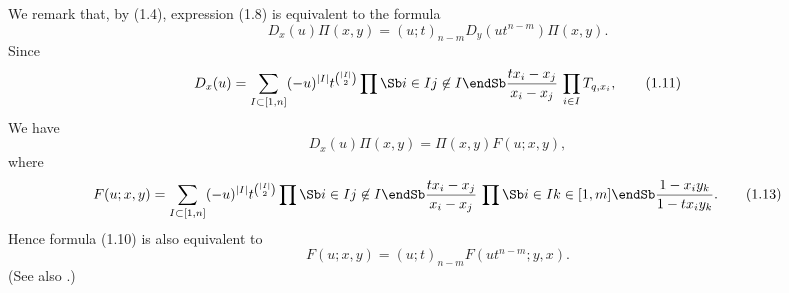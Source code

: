We remark that, by (1.4), expression (1.8) is equivalent to the formula
$$
D_x(u)\Pi(x,y)=(u;t)_{n-m} D_y(u t^{n-m}) \Pi(x,y).
\tag{1.10}
$$
Since 
$$
D_x(u)=\sum_{I\subset[1,n]} (-u)^{|I|} t^{\binom{|I|}{2}}
\prod\Sb i\in I\\ j\not\in I\endSb
\frac{tx_i-x_j}{x_i-x_j} \, \prod_{i\in I}T_{q,x_i}, 
\tag{1.11}
$$
We have 
$$
D_x(u) \Pi(x,y) = \Pi(x,y) F(u;x,y),
\tag{1.12}
$$
where
$$
F(u;x,y)=\sum_{I\subset[1,n]} (-u)^{|I|} t^{\binom{|I|}{2}}
\prod\Sb i\in I\\ j\not\in I\endSb 
\frac{tx_i-x_j}{x_i-x_j} \, 
\prod\Sb i\in I\\ k\in[1,m]\endSb
\frac{1-x_iy_k}{1-tx_iy_k}.
\tag{1.13}
$$
Hence formula (1.10) is also equivalent to 
$$
F(u;x,y)=(u;t)_{n-m} F(ut^{n-m};y,x). 
\tag{1.14}
$$
(See also \cite{MN}.)
%

